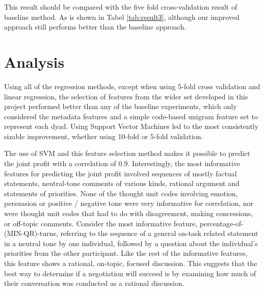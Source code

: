\documentclass[11pt]{article} %
\begin{document}
This result should be compared with the five fold cross-validation result of baseline method. As is shown in Tabel \ref{tab:result3}, although our improved approach still performs better than the baseline approach.

\section{Analysis}

Using all of the regression methods, except when using 5-fold cross validation and linear regression, the selection of features from the wider set developed in this project performed better than any of the baseline experiments, which only considered the metadata features and a simple code-based unigram feature set to represent each dyad.  Using Support Vector Machines led to the most consistently sizable improvement, whether using 10-fold or 5-fold validation.

The use of SVM and this feature selection method makes it possible to predict the joint profit with a correlation of 0.9.  Interestingly, the most informative features for predicting the joint profit involved sequences of mostly factual statements, neutral-tone comments of various kinds, rational argument and statements of priorities.  None of the thought unit codes involving emotion, persuasion or positive / negative tone were very informative for correlation, nor were thought unit codes that had to do with disagreement, making concessions, or off-topic comments.  Consider the most informative feature, percentage-of-(MIN-QR)-turns, referring to the sequence of a general on-task related statement in a neutral tone by one individual, followed by a question about the individual's priorities from the other participant.  Like the rest of the informative features, this feature shows a rational, on-topic, focused discussion.  This suggests that the best way to determine if a negotiation will succeed is by examining how much of their conversation was conducted as a rational discussion.
\end{document}
